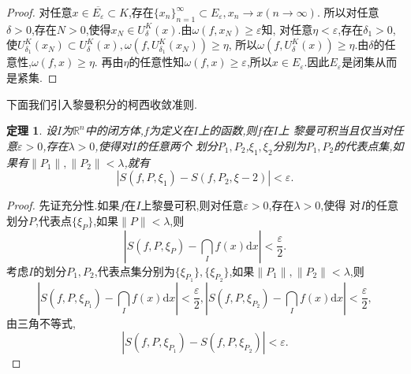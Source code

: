 \documentclass[a4paper,12pt]{article}
\newtheorem{theorem}{定理}[section]
\begin{document}
{\begin{proof}
                    对任意$x\in\overline{E_\varepsilon}\subset K$,存在$\{x_n\}_{n=1}^\infty\subset E_\varepsilon,x_n\to x(n\to\infty)$.
                    所以对任意$\delta>0$,存在$N>0$,使得$x_N\in U_\delta^K(x)$.由$\omega(f,x_N)\geqslant\varepsilon$知,
                    对任意$\eta<\varepsilon$,存在$\delta_1>0$,使$U_{\delta_1}^K(x_N)\subset U_\delta^K(x),\omega(f,U_{\delta_1}^K(x_N))\geqslant\eta$,
                    所以$\omega(f,U_\delta^K(x))\geqslant\eta$.由$\delta$的任意性,$\omega(f,x)\geqslant\eta$.
                    再由$\eta$的任意性知$\omega(f,x)\geqslant\varepsilon$,所以$x\in E_\varepsilon$.因此$E_\varepsilon$是闭集从而是紧集.
                \end{proof}

                下面我们引入黎曼积分的柯西收敛准则.
                \begin{theorem}
                    设$I$为$\mathbb{R}^n$中的闭方体,$f$为定义在$I$上的函数,则$f$在$I$上
                    黎曼可积当且仅当对任意$\varepsilon>0$,存在$\lambda>0$,使得对$I$的任意两个
                    划分$P_1,P_2$,$\xi_1,\xi_2$分别为$P_1,P_2$的代表点集,如果有$\|P_1\|,\|P_2\|<\lambda$,就有
                    $$\left|S(f,P,\xi_1)-S(f,P_2,\xi-2)\right|<\varepsilon.$$
                \end{theorem}
                \begin{proof}
                    先证充分性.如果$f$在$I$上黎曼可积,则对任意$\varepsilon>0$,存在$\lambda>0$,使得
                    对$I$的任意划分$P$,代表点$\{\xi_P\}$,如果$\|P\|<\lambda$,则
                    $$\left|S(f,P,\xi_P)-\dint_If(x)\mathrm{d}x\right|<\dfrac{\varepsilon}{2}.$$
                    考虑$I$的划分$P_1,P_2$,代表点集分别为$\{\xi_{P_1}\},\{\xi_{P_2}\}$,如果$\|P_1\|,\|P_2\|<\lambda$,则
                    $$\left|S(f,P,\xi_{P_1})-\dint_If(x)\mathrm{d}x\right|<\dfrac{\varepsilon}{2},\left|S(f,P,\xi_{P_2})-\dint_If(x)\mathrm{d}x\right|<\dfrac{\varepsilon}{2},$$
                    由三角不等式,$$|S(f,P,\xi_{P_1})-S(f,P,\xi_{P_2})|<\varepsilon.$$


\end{proof}}
\end{document}
